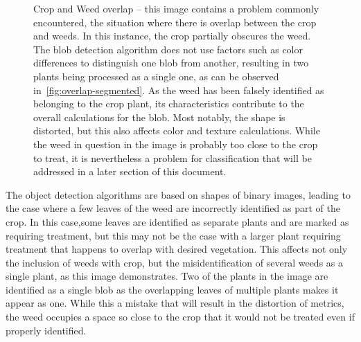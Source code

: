 \documentclass[letterpaper]{article}
\begin{document}
{\begin{figure}[h]
	\centering
	\hfill
	\caption[Crop and Weed overlap]{Crop and Weed overlap -- this image contains a problem commonly encountered, the situation where there is overlap between the crop and weeds. In this instance, the crop partially obscures the weed. The blob detection algorithm does not use factors such as color differences to distinguish one blob from another, resulting in two plants being processed as a single one, as can be observed in~\ref{fig:overlap-segmented}. As the weed has been falsely identified as belonging to the crop plant, its characteristics contribute to the overall calculations for the blob. Most notably, the shape is distorted, but this also affects color and texture calculations. While the weed in question in the image is probably too close to the crop to treat, it is nevertheless a problem for classification that will be addressed in a later section of this document.}
	\label{fig:overlap}
\end{figure}


The object detection algorithms are based on shapes of binary images, leading to the case where a few leaves of the weed are incorrectly identified as part of the crop. In this case,some leaves are identified as separate plants and are marked as requiring treatment, but this may not be the case with a larger plant requiring treatment that happens to overlap with desired vegetation. This affects not only the inclusion of weeds with crop, but the misidentification of several weeds as a single plant, as this image demonstrates.  Two of the plants in the image are identified as a single blob as the overlapping leaves of multiple plants makes it appear as one. While this a mistake that will result in the distortion of metrics, the weed occupies a space so close to the crop that it would not be treated even if properly identified.

}
\end{document}
